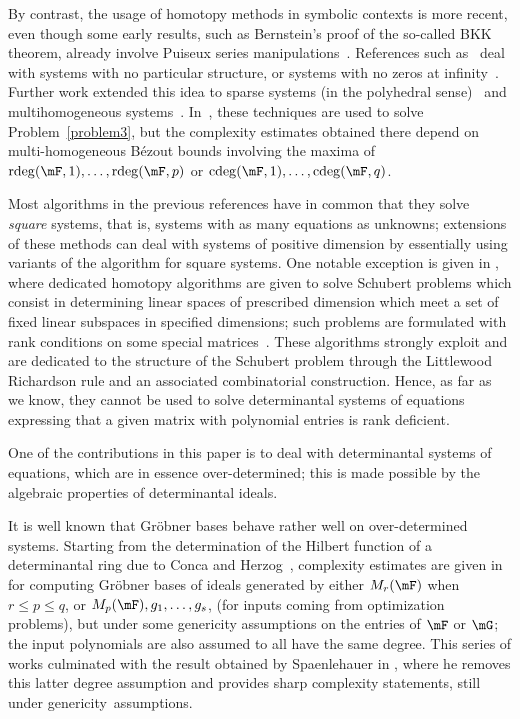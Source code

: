 \documentclass[12pt]{article}
\begin{document}
By contrast, the usage of homotopy methods in symbolic contexts is
more recent, even though some early results, such as Bernstein's proof
of the so-called BKK theorem, already involve Puiseux series
manipulations~\cite{Bernstein75}. References such
as~\cite{HeKrPuSaWa99,BoMaWaWa04} deal with systems with no particular
structure, or systems with no zeros at infinity~\cite{PaSa04}.
Further work extended this idea to sparse systems (in the polyhedral
sense)~\cite{JeMaSoWa09,HeJeSa10,HeJeSa13,HeJeSa14} and
multihomogeneous systems~\cite{HeJeSaSo02,SaSc16}.  In~\cite{SaSc16},
these techniques are used to solve Problem~\eqref{problem3}, but the
complexity estimates obtained there depend on multi-homogeneous
B\'ezout bounds involving the maxima of $\rdeg(\mF, 1), \ldots,
\rdeg(\mF, p)$ or $\cdeg(\mF,1), \ldots, \cdeg(\mF, q)$.

Most algorithms in the previous references have in common that they
solve {\em square} systems, that is, systems with as many equations as
unknowns; extensions of these methods can deal with systems of
positive dimension by essentially using variants of the algorithm for
square systems.  One notable exception is given in \cite{SVV10}, where
dedicated homotopy algorithms are given to solve Schubert problems
which consist in determining linear spaces of prescribed dimension
which meet a set of fixed linear subspaces in specified
dimensions; such problems are formulated with rank
conditions on some special matrices~\cite{LDSVV18}. These
algorithms strongly exploit and are dedicated to the structure of the
Schubert problem through the Littlewood Richardson rule and an
associated combinatorial construction. Hence, as far as we know, they
cannot be used to solve determinantal systems of equations expressing
that a given matrix with polynomial entries is rank deficient. 

One of the contributions in this paper is to deal with determinantal
systems of equations, which are in essence over-determined; this is
made possible by the algebraic properties of determinantal ideals.

It is well known that Gr\"obner bases behave rather well on
over-determined systems. Starting from the determination of the
Hilbert function of a determinantal ring due to Conca and
Herzog~\cite{CH94}, complexity estimates are given in
\cite{FSS13,FSS12} for computing Gr\"obner bases of ideals generated
by either $M_r(\mF)$ when $r\leq p\leq q$, or
$M_{p}(\mF),g_1,\dots,g_s$, (for inputs coming from optimization
problems), but under some genericity assumptions on the entries of
$\mF$ or $\mG$; the input polynomials are also assumed to all have the
same degree.  This series of works culminated with the result obtained
by Spaenlehauer in \cite{Spa14}, where he removes this latter degree
assumption and provides sharp complexity statements, still under
genericity~assumptions.
\end{document}
